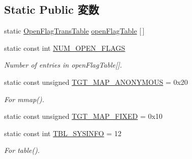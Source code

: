 \subsection*{Static Public 変数}
\begin{DoxyCompactItemize}
\item 
static \hyperlink{structOpenFlagTransTable}{OpenFlagTransTable} \hyperlink{classArmLinux64_ab1db5a531609b99b262cc849ea24765a}{openFlagTable} \mbox{[}$\,$\mbox{]}
\item 
static const int \hyperlink{classArmLinux64_ad85b9918c8f2c8739537a002dc1dc526}{NUM\_\-OPEN\_\-FLAGS}
\begin{DoxyCompactList}\small\item\em Number of entries in openFlagTable\mbox{[}\mbox{]}. \item\end{DoxyCompactList}\item 
static const unsigned \hyperlink{classArmLinux64_a0bbc267200567dd98250b99b6085a499}{TGT\_\-MAP\_\-ANONYMOUS} = 0x20
\begin{DoxyCompactList}\small\item\em For mmap(). \item\end{DoxyCompactList}\item 
static const unsigned \hyperlink{classArmLinux64_a0124e421d7846143bca15728b7a53e14}{TGT\_\-MAP\_\-FIXED} = 0x10
\item 
static const int \hyperlink{classArmLinux64_a02a979126f2aa34bcdfdc6ab92207d3b}{TBL\_\-SYSINFO} = 12
\begin{DoxyCompactList}\small\item\em For table(). \item\end{DoxyCompactList}\end{DoxyCompactItemize}
\label{_amgrpd41d8cd98f00b204e9800998ecf8427e}
